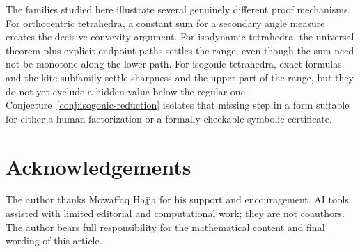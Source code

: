 \documentclass[11pt,a4paper]{article}
\theoremstyle{definition}
\theoremstyle{remark}
\begin{document}
The families studied here illustrate several genuinely different proof
mechanisms.
For orthocentric tetrahedra, a constant sum for a secondary angle measure
creates the decisive convexity argument.  For isodynamic tetrahedra, the
universal theorem plus explicit endpoint paths settles the range, even
though the sum need not be monotone along the lower path.  For isogonic
tetrahedra, exact formulas and the kite subfamily settle sharpness and the
upper part of the range, but they do not yet exclude a hidden value below the
regular one.  Conjecture~\ref{conj:isogonic-reduction} isolates that missing
step in a form suitable for either a human factorization or a formally
checkable symbolic certificate.

\section*{Acknowledgements}
The author thanks Mowaffaq Hajja for his support and encouragement.
 AI tools assisted with limited editorial and computational work; they are
 not coauthors.  The author bears full responsibility for the mathematical
 content and final wording of this article.
\end{document}
